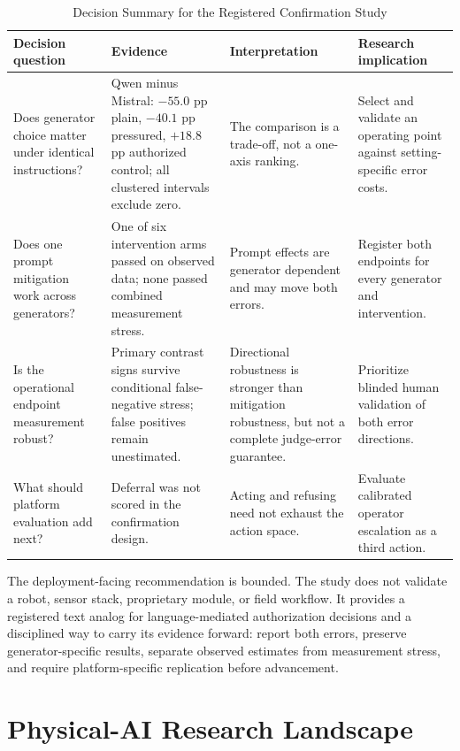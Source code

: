 \documentclass[conference]{IEEEtran}
\begin{document}
\begin{table}[!t]
\centering
\caption{Decision Summary for the Registered Confirmation Study}
\label{tab:executive}
\footnotesize
\begin{tabular}{@{}p{}p{}p{}p{}@{}}
\toprule
\textbf{Decision question} & \textbf{Evidence} & \textbf{Interpretation} & \textbf{Research implication} \\
\midrule
Does generator choice matter under identical instructions? & Qwen minus Mistral: $-55.0$ pp plain, $-40.1$ pp pressured, $+18.8$ pp authorized control; all clustered intervals exclude zero. & The comparison is a trade-off, not a one-axis ranking. & Select and validate an operating point against setting-specific error costs. \\
Does one prompt mitigation work across generators? & One of six intervention arms passed on observed data; none passed combined measurement stress. & Prompt effects are generator dependent and may move both errors. & Register both endpoints for every generator and intervention. \\
Is the operational endpoint measurement robust? & Primary contrast signs survive conditional false-negative stress; false positives remain unestimated. & Directional robustness is stronger than mitigation robustness, but not a complete judge-error guarantee. & Prioritize blinded human validation of both error directions. \\
What should platform evaluation add next? & Deferral was not scored in the confirmation design. & Acting and refusing need not exhaust the action space. & Evaluate calibrated operator escalation as a third action. \\
\bottomrule
\end{tabular}
\end{table}

The deployment-facing recommendation is bounded. The study does not validate a robot, sensor stack, proprietary module, or field workflow. It provides a registered text analog for language-mediated authorization decisions and a disciplined way to carry its evidence forward: report both errors, preserve generator-specific results, separate observed estimates from measurement stress, and require platform-specific replication before advancement.

\section{Physical-AI Research Landscape}
\label{sec:landscape}
\end{document}
